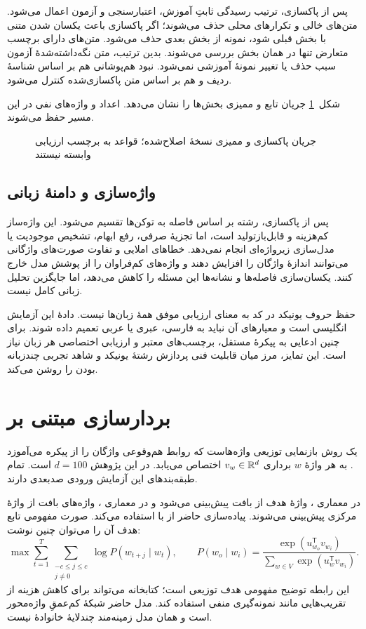 پس از پاکسازی، ترتیب رسیدگی ثابتِ آموزش، اعتبارسنجی و آزمون اعمال می‌شود. متن‌های خالی و تکرارهای محلی حذف می‌شوند؛ اگر پاکسازی باعث یکسان شدن متنی با بخش قبلی شود، نمونه از بخش بعدی حذف می‌شود. متن‌های دارای برچسب متعارض تنها در همان بخش بررسی می‌شوند. بدین ترتیب، متن نگه‌داشته‌شدۀ آزمون سبب حذف یا تغییر نمونۀ آموزشی نمی‌شود. نبود هم‌پوشانی هم بر اساس شناسۀ ردیف و هم بر اساس متن پاکسازی‌شده کنترل می‌شود.

شکل~\ref{fig:cleaning} جریان تابع  و ممیزی بخش‌ها را نشان می‌دهد. اعداد و واژه‌های نفی در این مسیر حفظ می‌شوند.
\begin{figure}[htbp]
\centering
\caption{جریان پاکسازی و ممیزی نسخۀ اصلاح‌شده؛ قواعد به برچسب ارزیابی وابسته نیستند}
\label{fig:cleaning}
\end{figure}

\subsection{واژه‌سازی و دامنۀ زبانی}
پس از پاکسازی، رشته بر اساس فاصله به توکن‌ها تقسیم می‌شود. این واژه‌ساز کم‌هزینه و قابل‌بازتولید است، اما تجزیۀ صرفی، رفع ابهام، تشخیص موجودیت یا مدل‌سازی زیرواژه‌ای انجام نمی‌دهد. خطاهای املایی و تفاوت صورت‌های واژگانی می‌توانند اندازۀ واژگان را افزایش دهند و واژه‌های کم‌فراوان را از پوشش مدل خارج کنند. یکسان‌سازی فاصله‌ها و نشانه‌ها این مسئله را کاهش می‌دهد، اما جایگزین تحلیل زبانی کامل نیست.

حفظ حروف یونیکد در کد به معنای ارزیابی موفق همۀ زبان‌ها نیست. دادۀ این آزمایش انگلیسی است و معیارهای آن نباید به فارسی، عبری یا عربی تعمیم داده شوند. برای چنین ادعایی به پیکرۀ مستقل، برچسب‌های معتبر و ارزیابی اختصاصی هر زبان نیاز است. این تمایز، مرز میان قابلیت فنی پردازش رشتۀ یونیکد و شاهد تجربی چندزبانه بودن را روشن می‌کند.

\section{بردارسازی مبتنی بر }
\label{sec:word2vec}
 یک روش بازنمایی توزیعی واژه‌هاست که روابط هم‌وقوعی واژگان را از پیکره می‌آموزد \cite{ref78}. به هر واژۀ $w$ برداری $v_w\in\mathbb{R}^{d}$ اختصاص می‌یابد. در این پژوهش $d=100$ است. تمام طبقه‌بندهای این آزمایش ورودی صدبعدی دارند.

در معماری ، واژۀ هدف از بافت پیش‌بینی می‌شود و در معماری ، واژه‌های بافت از واژۀ مرکزی پیش‌بینی می‌شوند. پیاده‌سازی حاضر از  با  استفاده می‌کند. صورت مفهومی تابع هدف آن را می‌توان چنین نوشت:
\begin{equation}
\max\sum_{t=1}^{T}\sum_{\substack{-c\le j\le c\\j\ne0}}
\log P(w_{t+j}\mid w_t),\qquad
P(w_o\mid w_i)=\frac{\exp(u_{w_o}^{\mathsf T}v_{w_i})}
{\sum_{w\in V}\exp(u_w^{\mathsf T}v_{w_i})}.
\label{eq:skipgram}
\end{equation}
این رابطه توضیح مفهومی هدف توزیعی است؛ کتابخانه می‌تواند برای کاهش هزینه از تقریب‌هایی مانند نمونه‌گیری منفی استفاده کند. مدل حاضر شبکۀ کم‌عمقِ واژه‌محور است و همان مدل زمینه‌مند چندلایۀ خانوادۀ  نیست.

